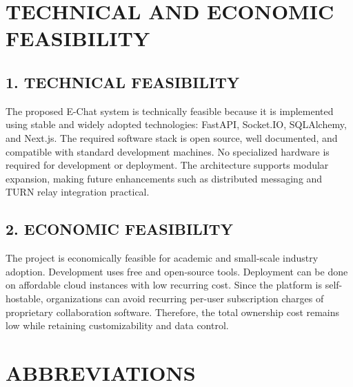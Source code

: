 \documentclass[12pt,a4paper,oneside]{report}
\begin{document}
\cleardoublepage

\chapter*{TECHNICAL AND ECONOMIC FEASIBILITY}
{}
\label{front:feasibility}
\thispagestyle{plain}

\section*{1. TECHNICAL FEASIBILITY}
\label{front:technical-feasibility}
The proposed E-Chat system is technically feasible because it is implemented using stable and widely adopted technologies: FastAPI, Socket.IO, SQLAlchemy, and Next.js. The required software stack is open source, well documented, and compatible with standard development machines. No specialized hardware is required for development or deployment. The architecture supports modular expansion, making future enhancements such as distributed messaging and TURN relay integration practical.

\section*{2. ECONOMIC FEASIBILITY}
\label{front:economic-feasibility}
The project is economically feasible for academic and small-scale industry adoption. Development uses free and open-source tools. Deployment can be done on affordable cloud instances with low recurring cost. Since the platform is self-hostable, organizations can avoid recurring per-user subscription charges of proprietary collaboration software. Therefore, the total ownership cost remains low while retaining customizability and data control.

\cleardoublepage

\chapter*{ABBREVIATIONS}
{}
\label{front:abbreviations}
\thispagestyle{plain}
\end{document}
